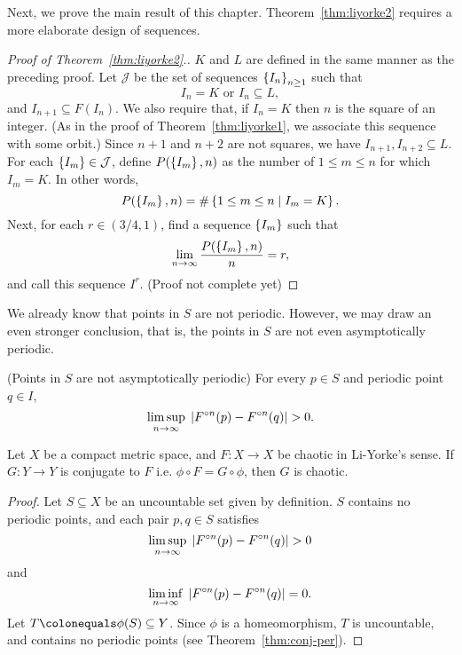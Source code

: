 \documentclass[12pt,draft,twoside]{book}
\begin{document}
Next, we prove the main result of this chapter.
Theorem~\ref{thm:liyorke2} requires a more elaborate design of sequences.
\begin{proof}[Proof of Theorem~\ref{thm:liyorke2}.]
  $K$ and $L$ are defined in the same manner as the preceding proof.
  Let $\mathcal{J}$ be the set of sequences $\left \{ I_n \right \}^{ }_{n\geq1}$ such that
  \begin{equation*}
    I_n = K \mbox{ or } I_n \subseteq L,
  \end{equation*}
  and $I_{n+1} \subseteq F(I_n)$.
  We also require that, if $I_n = K$ then $n$ is the square of an integer.
  (As in the proof of Theorem~\ref{thm:liyorke1}, we associate this sequence with some orbit.)
  Since $n+1$ and $n+2$ are not squares, we have $I_{n+1}, I_{n+2} \subseteq L$.
  For each $\left \{ I_m \right \} \in \mathcal{J}$, define $P(\left \{ I_m \right \},n)$ as the number of $1 \leq m \leq n$ for which $I_m = K$.
  In other words,
  \begin{equation*}
    P(\left \{ I_m \right \},n) = \#\left \{ 1 \leq m \leq n \mathrel{} \middle| \mathrel{} I_m = K \right \}.
  \end{equation*}
  Next, for each $r \in (3/4, 1)$, find a sequence $\left \{ I_m \right \}$ such that
  \begin{equation*}
    \lim\limits_{n\to \infty}\frac{P(\left \{ I_m \right \},n)}{n} = r,
  \end{equation*}
  and call this sequence $I^r$.
  (Proof not complete yet)
\end{proof}

We already know that points in $S$ are not periodic.
However, we may draw an even stronger conclusion, that is, the points in $S$ are not even asymptotically periodic.
\begin{theorem}
  (Points in $S$ are not asymptotically periodic)
  For every $p \in S$ and periodic point $q \in I$,
  \begin{equation*}
    \limsup\limits_{n \to \infty}\; \left | F^{\circ n}(p) - F^{\circ n}(q) \right | > 0.
  \end{equation*}
  \label{thm:liyorke3}
\end{theorem}


\begin{theorem}
  Let $X$ be a compact metric space, and $F: X\to X$ be chaotic in Li-Yorke's sense.
  If $G: Y\to Y$ is conjugate to $F$ i.e. $\phi \circ F = G \circ \phi$, then $G$ is chaotic.
  \begin{proof}
    Let $S \subseteq X$ be an uncountable set given by definition.
    $S$ contains no periodic points, and each pair $p,q \in S$ satisfies
    \begin{equation}
      \limsup\limits_{n \to \infty}\; \left | F^{\circ n}(p) - F^{\circ n}(q) \right | > 0
    \end{equation}
    and
    \begin{equation}
      \liminf\limits_{n \to \infty}\; \left | F^{\circ n}(p) - F^{\circ n}(q) \right | = 0.
    \end{equation}
    Let $T \ceq \phi(S) \subseteq Y$.
    Since $\phi$ is a homeomorphism, $T$ is uncountable, and contains no periodic points (see Theorem~\ref{thm:conj-per}).

  \end{proof}
  \label{thm:liyorke-conj}
\end{theorem}
\end{document}
